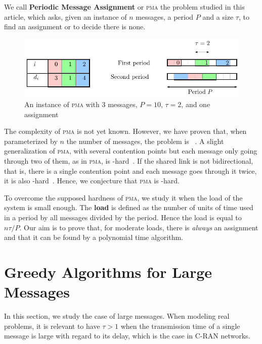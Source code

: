 \documentclass[a4paper,UKenglish,cleveref, autoref, thm-restate]{lipics-v2019}
\newcommand\pma{\textsc{pma}\xspace}
\begin{document}
We call \textbf{Periodic Message Assignment} or \pma the problem studied in this article,
which asks, given an instance of $n$ messages, a period $P$ and a size $\tau$, to find 
an assignment or to decide there is none.
\begin{figure}
\begin{center}
\includegraphics[scale=0.7]{instance}
\end{center}
\caption{An instance of \pma with $3$ messages, $P= 10$, $\tau = 2$, and one assignment}
\label{fig:assignment}
\end{figure}

The complexity of \pma is not yet known. However, we have proven that, when parameterized by
$n$ the number of messages, the problem is \FPT~\cite{barth2018deterministic}.
A slight generalization of \pma, with several contention points but each message only going through two of them, as in \pma, is \NP-hard~\cite{barth2018deterministic}. If the shared link is not bidirectional, that is, there is a single contention point and each message goes through it twice, it is also \NP-hard~\cite{orman1997complexity}. Hence, we conjecture that \pma is \NP-hard.

To overcome the supposed hardness of \pma, we study it when the load of the system is small enough. The \textbf{load} is defined as the number of units of time used in a period by all messages divided by the period. Hence the load is equal to $n\tau /P$. Our aim is to prove that, for moderate loads, there is \emph{always} an assignment and that it can be found by a polynomial time algorithm.



\section{Greedy Algorithms for Large Messages} \label{sec:large}

In this section, we study the case of large messages. When modeling real problems,
it is relevant to have $\tau > 1$ when the transmission time of a single message is large with regard to its delay,
which is the case in C-RAN networks.
\end{document}
